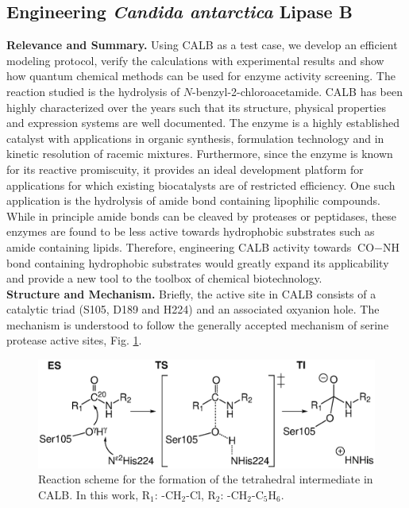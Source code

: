 \subsection{Engineering {\textit{Candida antarctica} Lipase B}}
\textbf{Relevance and Summary.}
Using CALB as a test case, we develop an efficient modeling protocol, verify the calculations with experimental results and show how quantum chemical methods can be used for enzyme activity screening\cite{10.1371/journal.pone.0049849, hediger2013silico}.
The reaction studied is the hydrolysis of $N$-benzyl-2-chloroacetamide.
CALB has been highly characterized over the years such that its structure, physical properties and expression systems are well documented\cite{uppenberg1994sequence, uppenberg1995crystallographic}.
The enzyme is a highly established catalyst with applications in organic synthesis, formulation technology\cite{gayot2003modification} and in kinetic resolution of racemic mixtures\cite{gotor2006candida, naik2010lipases, chaput2012contribution}.
Furthermore, since the enzyme is known for its reactive promiscuity\cite{bornscheuer2004catalytic, CBIC:CBIC200800318}, it provides an ideal development platform for applications for which existing biocatalysts are of restricted efficiency.
One such application is the hydrolysis of amide bond containing lipophilic compounds.
While in principle amide bonds can be cleaved by proteases or peptidases, these enzymes are found to be less active towards hydrophobic substrates such as amide containing lipids\cite{nakagawa2007engineering}.
Therefore, engineering CALB activity towards ${\text{CO}-\text{NH}}$ bond containing hydrophobic substrates would greatly expand its applicability and provide a new tool to the toolbox of chemical biotechnology.\\
\textbf{Structure and Mechanism.}
Briefly, the active site in CALB consists of a catalytic triad (S105, D189 and H224) and an associated oxyanion hole.
The mechanism is understood to follow the generally accepted mechanism of serine protease active sites\cite{hedstrom2002serine}, Fig. \ref{fig:calb-mechanism}.
\begin{figure}[htbp] 
\includegraphics[width=0.98\linewidth]{calb-mechanism.eps}
\caption{
Reaction scheme for the formation of the tetrahedral intermediate in CALB.
In this work, R$_1$: -CH$_2$-Cl, R$_2$: -CH$_2$-C$_5$H$_6$\cite{hediger2013silico}.
}
\label{fig:calb-mechanism}
\end{figure}
